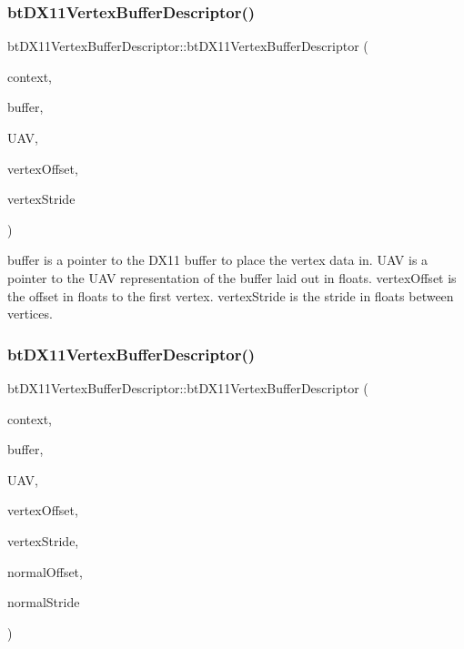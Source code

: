 \subsubsection{\texorpdfstring{bt\+D\+X11\+Vertex\+Buffer\+Descriptor()}{btDX11VertexBufferDescriptor()}\hspace{0.1cm}{\footnotesize\ttfamily [1/4]}}
{\footnotesize\ttfamily bt\+D\+X11\+Vertex\+Buffer\+Descriptor\+::bt\+D\+X11\+Vertex\+Buffer\+Descriptor (\begin{DoxyParamCaption}\item[{I\+D3\+D11\+Device\+Context $\ast$}]{context,  }\item[{I\+D3\+D11\+Buffer $\ast$}]{buffer,  }\item[{I\+D3\+D11\+Unordered\+Access\+View $\ast$}]{U\+AV,  }\item[{int}]{vertex\+Offset,  }\item[{int}]{vertex\+Stride }\end{DoxyParamCaption})\hspace{0.3cm}{\ttfamily [inline]}}

buffer is a pointer to the D\+X11 buffer to place the vertex data in. U\+AV is a pointer to the U\+AV representation of the buffer laid out in floats. vertex\+Offset is the offset in floats to the first vertex. vertex\+Stride is the stride in floats between vertices. \mbox{\label{classbtDX11VertexBufferDescriptor_a85ff10c8bcf97f7109496411d2eded6e}} 
\subsubsection{\texorpdfstring{bt\+D\+X11\+Vertex\+Buffer\+Descriptor()}{btDX11VertexBufferDescriptor()}\hspace{0.1cm}{\footnotesize\ttfamily [2/4]}}
{\footnotesize\ttfamily bt\+D\+X11\+Vertex\+Buffer\+Descriptor\+::bt\+D\+X11\+Vertex\+Buffer\+Descriptor (\begin{DoxyParamCaption}\item[{I\+D3\+D11\+Device\+Context $\ast$}]{context,  }\item[{I\+D3\+D11\+Buffer $\ast$}]{buffer,  }\item[{I\+D3\+D11\+Unordered\+Access\+View $\ast$}]{U\+AV,  }\item[{int}]{vertex\+Offset,  }\item[{int}]{vertex\+Stride,  }\item[{int}]{normal\+Offset,  }\item[{int}]{normal\+Stride }\end{DoxyParamCaption})\hspace{0.3cm}{\ttfamily [inline]}}

